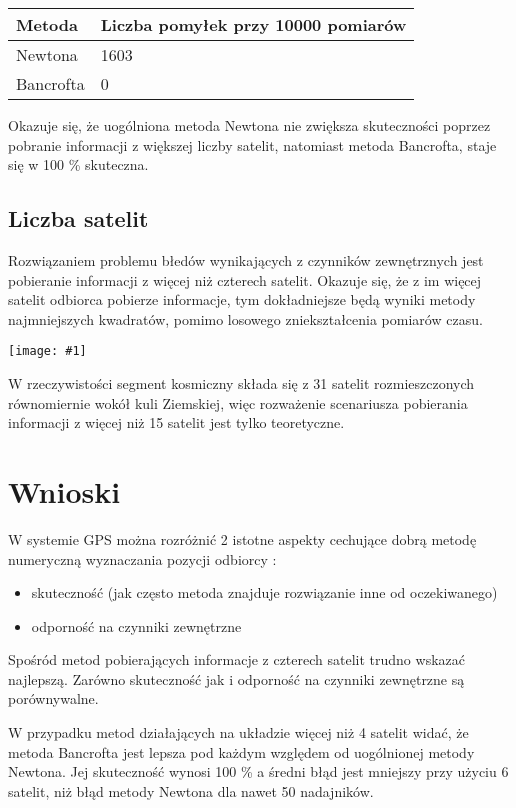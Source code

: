 \documentclass{article}
\newcommand{\plot}[1] {
	\texttt{[image: \#1]}
}
\begin{document}
\begin{tabular}{ |p{4cm}|p{6cm}|  }
 \hline
 	Metoda  & Liczba pomyłek przy 10000 pomiarów\\
 \hline
  	Newtona & 1603 \\
 \hline
 	Bancrofta & 0 \\
 \hline
\end{tabular}

Okazuje się, że uogólniona metoda Newtona nie zwiększa skuteczności poprzez pobranie informacji z większej liczby satelit, natomiast metoda Bancrofta, staje się w 100 \% skuteczna.


\subsection{Liczba satelit}

Rozwiązaniem problemu błedów wynikających z czynników zewnętrznych jest pobieranie informacji z więcej niż czterech satelit. Okazuje się, że z im więcej satelit odbiorca pobierze informacje, tym dokładniejsze będą wyniki metody najmniejszych kwadratów, pomimo losowego zniekształcenia pomiarów czasu.

\plot{liczbasatelit.png}

W rzeczywistości segment kosmiczny składa się z 31 satelit rozmieszczonych równomiernie wokół kuli Ziemskiej, więc rozważenie scenariusza pobierania informacji z więcej niż 15 satelit jest tylko teoretyczne.

\section{Wnioski}

W systemie GPS można rozróżnić 2 istotne aspekty cechujące dobrą metodę numeryczną wyznaczania pozycji odbiorcy :
\begin{itemize}
	\item skuteczność (jak często metoda znajduje rozwiązanie inne od oczekiwanego)
	\item odporność na czynniki zewnętrzne
\end{itemize}

\par Spośród metod pobierających informacje z czterech satelit trudno wskazać najlepszą. Zarówno skuteczność jak i odporność na czynniki zewnętrzne są porównywalne.

\par W przypadku metod działających na układzie więcej niż 4 satelit widać, że metoda Bancrofta jest lepsza pod każdym względem od uogólnionej metody Newtona. Jej skuteczność wynosi 100 \% a średni błąd jest mniejszy przy użyciu 6 satelit, niż błąd metody Newtona dla nawet 50 nadajników.
\end{document}
